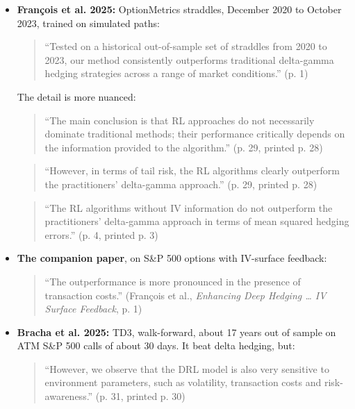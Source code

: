 \documentclass{article}
\begin{document}
\begin{itemize}

\item \textbf{François et al. 2025:} OptionMetrics straddles, December 2020 to October 2023, trained on simulated paths:

\begin{quote}``Tested on a historical out-of-sample set of straddles from 2020 to 2023, our method consistently outperforms traditional delta-gamma hedging strategies across a range of market conditions.'' (p. 1)\end{quote}

The detail is more nuanced:

\begin{quote}``The main conclusion is that RL approaches do not necessarily dominate traditional methods; their performance critically depends on the information provided to the algorithm.'' (p. 29, printed p. 28)\end{quote}

\begin{quote}``However, in terms of tail risk, the RL algorithms clearly outperform the practitioners' delta-gamma approach.'' (p. 29, printed p. 28)\end{quote}

\begin{quote}``The RL algorithms without IV information do not outperform the practitioners' delta-gamma approach in terms of mean squared hedging errors.'' (p. 4, printed p. 3)\end{quote}

\item \textbf{The companion paper}, on S\&P 500 options with IV-surface feedback:

\begin{quote}``The outperformance is more pronounced in the presence of transaction costs.'' (François et al., \emph{Enhancing Deep Hedging \ldots{} IV Surface Feedback}, p. 1)\end{quote}

\item \textbf{Bracha et al. 2025:} TD3, walk-forward, about 17 years out of sample on ATM S\&P 500 calls of about 30 days. It beat delta hedging, but:

\begin{quote}``However, we observe that the DRL model is also very sensitive to environment parameters, such as volatility, transaction costs and risk-awareness.'' (p. 31, printed p. 30)\end{quote}


\end{itemize}
\end{document}
